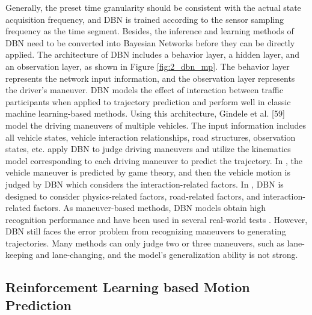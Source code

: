 Generally, the preset time granularity should be consistent with the actual state acquisition frequency, and DBN is trained according to the sensor sampling frequency as the time segment. Besides, the inference and learning methods of DBN need to be converted into Bayesian Networks before they can be directly applied. The architecture of DBN includes a behavior layer, a hidden layer, and an observation layer, as shown in Figure \ref{fig:2_dbn_mp}. The behavior layer represents the network input information, and the observation layer represents the driver’s maneuver. DBN models the effect of interaction between traffic participants when applied to trajectory prediction and perform well in classic machine learning-based methods. Using this architecture, Gindele et al. [59] model the driving maneuvers of multiple vehicles. The input information includes all vehicle states, vehicle interaction relationships, road structures, observation states, etc. \cite{schreier2016integrated} apply DBN to judge driving maneuvers and utilize the kinematics model corresponding to each driving maneuver to predict the trajectory. In \cite{bahram2015game}, the vehicle maneuver is predicted by game theory, and then the vehicle motion is judged by DBN which considers the interaction-related factors. In \cite{li2019dynamic}, DBN is designed to consider physics-related factors, road-related factors, and interaction-related factors. As maneuver-based methods, DBN models obtain high recognition performance and have been used in several real-world tests \cite{weidl2014optimizing}. However, DBN still faces the error problem from recognizing maneuvers to generating trajectories. Many methods can only judge two or three maneuvers, such as lane-keeping and lane-changing, and the model’s generalization ability is not strong.

\subsection{Reinforcement Learning based Motion Prediction}
\label{sec:2_rl_based_mp}

